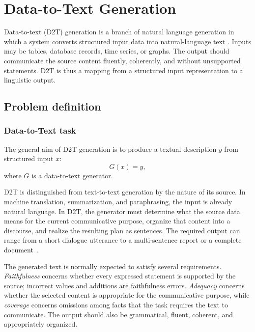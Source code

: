 
\chapter{Data-to-Text Generation}

Data-to-text (D2T) generation is a branch of natural language generation in
which a system converts structured input data into natural-language text
\cite{gatt2018survey,osuji2024systematic}. Inputs may be tables, database
records, time series, or graphs. The output should communicate the source
content fluently, coherently, and without unsupported statements. D2T is thus a
mapping from a structured input representation to a linguistic output.

\section{Problem definition}
\label{sec:d2t-problem-definition}

\subsection{Data-to-Text task}

The general aim of D2T generation is to produce a textual description $y$ from
structured input $x$:
\begin{equation}
    G(x) = y,
\end{equation}
where $G$ is a data-to-text generator. 

D2T is distinguished from text-to-text generation by the nature of its source.
In machine translation, summarization, and paraphrasing, the input is already
natural language. In D2T, the generator must determine what the source data
means for the current communicative purpose, organize that content into a
discourse, and realize the resulting plan as sentences. The
required output can range from a short dialogue utterance to a multi-sentence
report or a complete document~\cite{gatt2018survey,osuji2024systematic}.

The generated text is normally expected to satisfy several requirements.
\emph{Faithfulness} concerns whether every expressed statement is supported by
the source; incorrect values and additions are faithfulness errors.
\emph{Adequacy} concerns whether the selected content is appropriate for the
communicative purpose, while \emph{coverage} concerns omissions among facts
that the task requires the text to communicate. The output should also be
grammatical, fluent, coherent, and appropriately organized.

